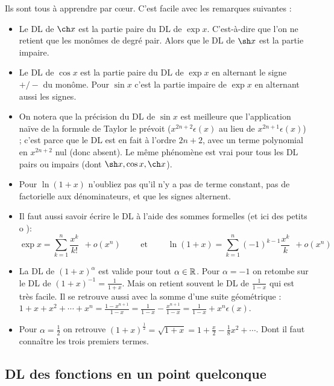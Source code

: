 \documentclass[class=report,crop=false]{standalone}
\begin{document}
Ils sont tous à apprendre par cœur. C'est facile avec les remarques suivantes :
\begin{itemize}
  \item Le DL de $\ch x$ est la partie paire du DL de $\exp x$. C'est-à-dire que l'on ne retient que les
monômes de degré pair. Alors que le DL de $\sh x$ est la partie impaire.

  \item Le DL de $\cos x$ est la partie paire du DL de $\exp x$ en alternant le signe $+/-$ du monôme.
Pour $\sin x$ c'est la partie impaire de $\exp x$ en alternant aussi les signes.

  \item On notera que la précision du DL de $\sin x$ est meilleure que l'application naïve de la formule de Taylor
  le prévoit ($x^{2n+2} \epsilon(x)$ au lieu de $x^{2n+1} \epsilon(x)$) ;
  c'est parce que le DL est en fait à l'ordre $2n+2$,
  avec un terme polynomial en $x^{2n+2}$ nul (donc absent). Le même phénomène est vrai pour tous les DL pairs ou impairs (dont $\sh x, \cos x, \ch x$).

  \item Pour $\ln(1+x)$ n'oubliez pas qu'il n'y a pas de terme constant, pas de factorielle aux dénominateurs,
et que les signes alternent.

  \item Il faut aussi savoir écrire le DL à l'aide des sommes formelles (et ici des \og petits o \fg{}):
$$\exp x=\sum_ {k=1}^n \frac{x^k}{k!} \ \ + o(x^n) \qquad \text{ et } \qquad \ln(1+x)=\sum_ {k=1}^n (-1)^{k-1}\frac{x^k}{k}\ \  + o(x^n)$$

  \item La DL de $(1+x)^\alpha$ est valide pour tout $\alpha \in \mathbb{R}$. Pour $\alpha = -1$ on retombe sur le DL
de $(1+x)^{-1} = \frac{1}{1+x}$. Mais on retient souvent le DL de $\frac{1}{1-x}$ qui est très facile.
Il se retrouve aussi avec la somme d'une suite géométrique :
$1+x+x^2+\cdots+x^n = \frac{1-x^{n+1}}{1-x}= \frac{1}{1-x} - \frac{x^{n+1}}{1-x} = \frac{1}{1-x} + x^n\epsilon(x)$.

  \item Pour $\alpha = \frac12$ on retrouve $(1+x)^{\frac12} = \sqrt{1+x} = 1 + \frac{x}{2} - \frac{1}{8}x^2+\cdots$.
Dont il faut connaître les trois premiers termes.
\end{itemize}


\subsection{DL des fonctions en un point quelconque}
\end{document}
